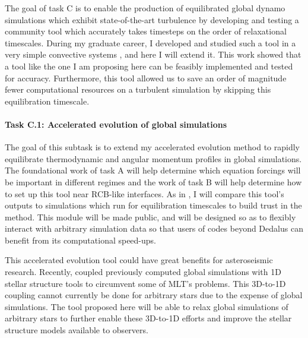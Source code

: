 \documentclass[11pt, preprint]{aastex}
\begin{document}
The goal of task C is to enable the production of equilibrated global dynamo simulations which exhibit state-of-the-art turbulence by developing and testing a community tool which accurately takes timesteps on the order of relaxational timescales.
During my graduate career, I developed and studied such a tool in a very simple convective systems \citep{anders&all2018}, and here I will extend it.
This work showed that a tool like the one I am proposing here can be feasibly implemented and tested for accuracy.
Furthermore, this tool allowed us to save an order of magnitude fewer computational resources on a turbulent simulation by skipping this equilibration timescale.

\vspace{-0.5cm}
\paragraph{Task C.1: Accelerated evolution of global simulations}
\label{sct:taskC1}
The goal of this subtask is to extend my accelerated evolution method to rapidly equilibrate thermodynamic and angular momentum profiles in global simulations.
The foundational work of task A will help determine which equation forcings will be important in different regimes and the work of task B will help determine how to set up this tool near RCB-like interfaces.
As in \citet{anders&all2018}, I will compare this tool's outputs to simulations which run for equilibration timescales to build trust in the method.
This module will be made public, and will be designed so as to flexibly interact with arbitrary simulation data so that users of codes beyond Dedalus can benefit from its computational speed-ups.

This accelerated evolution tool could have great benefits for asteroseismic research.
Recently, \citet{jorgensen&weiss2019} coupled previously computed global simulations with 1D stellar structure tools to circumvent some of MLT's problems.
This 3D-to-1D coupling cannot currently be done for arbitrary stars due to the expense of global simulations. 
The tool proposed here will be able to relax global simulations of arbitrary stars to further enable these 3D-to-1D efforts and improve the stellar structure models available to observers.


\vspace{-0.7cm}
\end{document}

